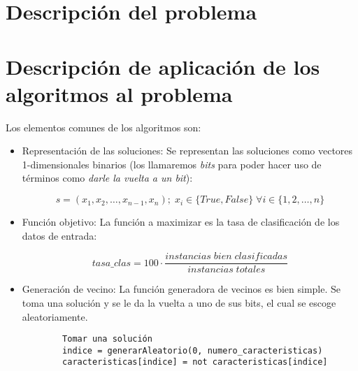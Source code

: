 \documentclass[a4paper, 11pt]{article}
\begin{document}
  \maketitle
  \tableofcontents
  \newpage

  \section{Descripción del problema}

    

  \section{Descripción de aplicación de los algoritmos al problema}
    Los elementos comunes de los algoritmos son:
    \begin{itemize}
      \item Representación de las soluciones: Se representan las soluciones como vectores 1-dimensionales binarios (los llamaremos \emph{bits} para poder hacer uso de términos como \emph{darle la vuelta a un bit}):

      $$ s = (x_1,x_2,\ldots,x_{n-1},x_n) ; \; x_i \in \{True,False\} \; \forall i \in \{1,2,\ldots,n\} $$
      \item Función objetivo: La función a maximizar es la tasa de clasificación de los datos de entrada:

      $$ tasa\_clas = 100 \cdot \frac{instancias\;bien\;clasificadas}{instancias\;totales} $$

      \item Generación de vecino: La función generadora de vecinos es bien simple. Se toma una solución y se le da la vuelta a uno de sus bits, el cual se escoge aleatoriamente.
      \begin{verbatim}
        Tomar una solución
        indice = generarAleatorio(0, numero_caracteristicas)
        caracteristicas[indice] = not caracteristicas[indice]
      \end{verbatim}
    \end{itemize}
\end{document}

